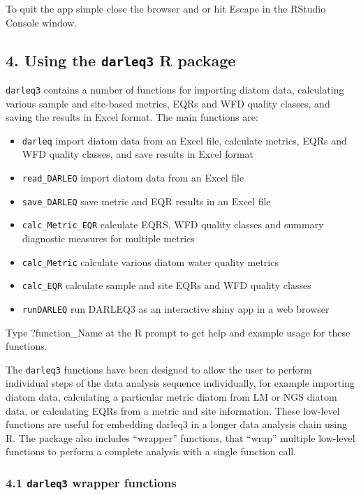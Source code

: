 \documentclass[]{article}
\providecommand{\tightlist}{%
  \setlength{\itemsep}{0pt}\setlength{\parskip}{0pt}}
\begin{document}
To quit the app simple close the browser and or hit Escape in the
RStudio Console window.

\subsection{\texorpdfstring{4. Using the \texttt{darleq3} R
package}{4. Using the darleq3 R package}}\label{using-the-darleq3-r-package}

\texttt{darleq3} contains a number of functions for importing diatom
data, calculating various sample and site-based metrics, EQRs and WFD
quality classes, and saving the results in Excel format. The main
functions are:

\begin{itemize}
\tightlist
\item
  \texttt{darleq} import diatom data from an Excel file, calculate
  metrics, EQRs and WFD quality classes, and save results in Excel
  format
\item
  \texttt{read\_DARLEQ} import diatom data from an Excel file
\item
  \texttt{save\_DARLEQ} save metric and EQR results in an Excel file
\item
  \texttt{calc\_Metric\_EQR} calculate EQRS, WFD quality classes and
  summary diagnostic measures for multiple metrics
\item
  \texttt{calc\_Metric} calculate various diatom water quality metrics
\item
  \texttt{calc\_EQR} calculate sample and site EQRs and WFD quality
  classes
\item
  \texttt{runDARLEQ} run DARLEQ3 as an interactive shiny app in a web
  browser
\end{itemize}

Type ?function\_Name at the R prompt to get help and example usage for
these functions.

The \texttt{darleq3} functions have been designed to allow the user to
perform individual steps of the data analysis sequence individually, for
example importing diatom data, calculating a particular metric diatom
from LM or NGS diatom data, or calculating EQRs from a metric and site
information. These low-level functions are useful for embedding darleq3
in a longer data analysis chain using R. The package also includes
``wrapper'' functions, that ``wrap'' multiple low-level functions to
perform a complete analysis with a single function call.

\subsubsection{\texorpdfstring{4.1 \texttt{darleq3} wrapper
functions}{4.1 darleq3 wrapper functions}}\label{darleq3-wrapper-functions}
\end{document}
